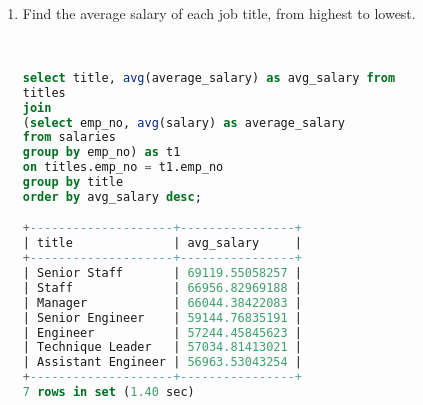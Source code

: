 \documentclass[12pt]{article}
\begin{document}
\begin{enumerate}
\begin{lstlisting}[language=SQL]
\end{lstlisting}


\item Find the average salary of each job title, from highest to lowest.

\begin{lstlisting}[language=SQL]


select title, avg(average_salary) as avg_salary from
titles
join
(select emp_no, avg(salary) as average_salary
from salaries 
group by emp_no) as t1
on titles.emp_no = t1.emp_no
group by title
order by avg_salary desc;

+--------------------+----------------+
| title              | avg_salary     |
+--------------------+----------------+
| Senior Staff       | 69119.55058257 |
| Staff              | 66956.82969188 |
| Manager            | 66044.38422083 |
| Senior Engineer    | 59144.76835191 |
| Engineer           | 57244.45845623 |
| Technique Leader   | 57034.81413021 |
| Assistant Engineer | 56963.53043254 |
+--------------------+----------------+
7 rows in set (1.40 sec)



\end{lstlisting}






\end{enumerate}



 
\end{document}
